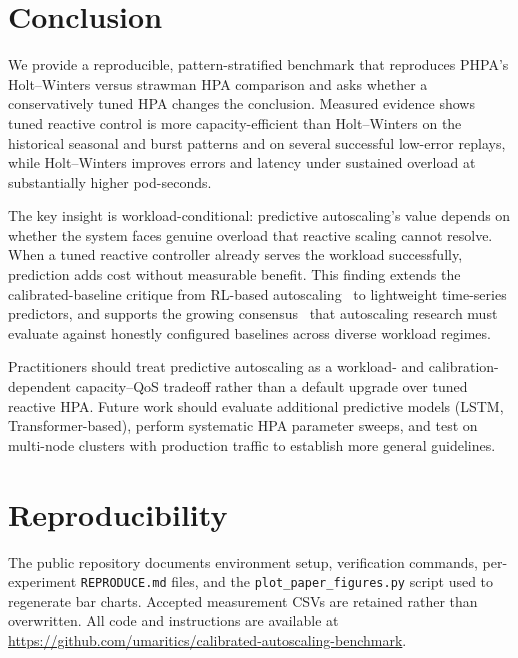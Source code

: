 \documentclass[journal]{IEEEtran}
\begin{document}
\section{Conclusion}
We provide a reproducible, pattern-stratified benchmark that reproduces PHPA's Holt--Winters versus strawman HPA comparison and asks whether a conservatively tuned HPA changes the conclusion. Measured evidence shows tuned reactive control is more capacity-efficient than Holt--Winters on the historical seasonal and burst patterns and on several successful low-error replays, while Holt--Winters improves errors and latency under sustained overload at substantially higher pod-seconds.

The key insight is workload-conditional: predictive autoscaling's value depends on whether the system faces genuine overload that reactive scaling cannot resolve. When a tuned reactive controller already serves the workload successfully, prediction adds cost without measurable benefit. This finding extends the calibrated-baseline critique from RL-based autoscaling~\cite{rlscale2026} to lightweight time-series predictors, and supports the growing consensus~\cite{mca2026, qu2018, dogani2023} that autoscaling research must evaluate against honestly configured baselines across diverse workload regimes.

Practitioners should treat predictive autoscaling as a workload- and calibration-dependent capacity--QoS tradeoff rather than a default upgrade over tuned reactive HPA. Future work should evaluate additional predictive models (LSTM, Transformer-based), perform systematic HPA parameter sweeps, and test on multi-node clusters with production traffic to establish more general guidelines.

\section*{Reproducibility}
The public repository documents environment setup, verification commands, per-experiment \texttt{REPRODUCE.md} files, and the \texttt{plot\_paper\_figures.py} script used to regenerate bar charts. Accepted measurement CSVs are retained rather than overwritten. All code and instructions are available at \url{https://github.com/umaritics/calibrated-autoscaling-benchmark}.
\end{document}
